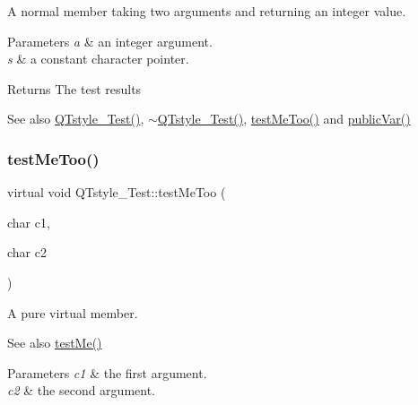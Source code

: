 A normal member taking two arguments and returning an integer value. 


\begin{DoxyParams}{Parameters}
{\em a} & an integer argument. \\
\hline
{\em s} & a constant character pointer. \\
\hline
\end{DoxyParams}
\begin{DoxyReturn}{Returns}
The test results 
\end{DoxyReturn}
\begin{DoxySeeAlso}{See also}
\hyperlink{classQTstyle__Test_a14a296ea4e2ad446712f2310bec60766}{Q\+Tstyle\+\_\+\+Test()}, \hyperlink{classQTstyle__Test_a7e82397d534d9a867f0857da01a46e9e}{$\sim$\+Q\+Tstyle\+\_\+\+Test()}, \hyperlink{classQTstyle__Test_ad5b201f097a720d44bf976c2f27efbda}{test\+Me\+Too()} and \hyperlink{classQTstyle__Test_aabf7b2e9ed83ea44aca4d213baae06d3}{public\+Var()} 
\end{DoxySeeAlso}
\mbox{\label{classQTstyle__Test_ad5b201f097a720d44bf976c2f27efbda}} 
\subsubsection{\texorpdfstring{test\+Me\+Too()}{testMeToo()}}
{\footnotesize\ttfamily virtual void Q\+Tstyle\+\_\+\+Test\+::test\+Me\+Too (\begin{DoxyParamCaption}\item[{char}]{c1,  }\item[{char}]{c2 }\end{DoxyParamCaption})\hspace{0.3cm}{\ttfamily [pure virtual]}}



A pure virtual member. 

\begin{DoxySeeAlso}{See also}
\hyperlink{classQTstyle__Test_a8840748753118dd468e8368a28e49c62}{test\+Me()} 
\end{DoxySeeAlso}

\begin{DoxyParams}{Parameters}
{\em c1} & the first argument. \\
\hline
{\em c2} & the second argument. \\
\hline
\end{DoxyParams}


